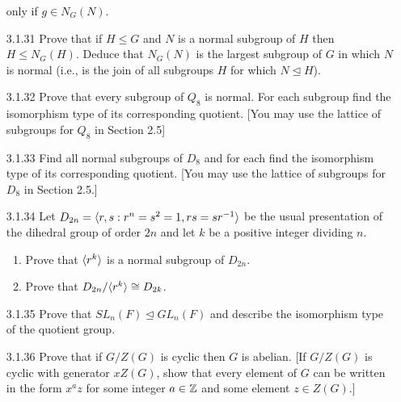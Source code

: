 \begin{enumerate}
                  only if $g \in N_G(N)$.
   \item[3.1.31]  Prove that if $H \le G$ and $N$ is a normal subgroup of $H$
                  then $H \le N_G(H)$. Deduce that $N_G(N)$ is the largest
                  subgroup of $G$ in which $N$ is normal (i.e., is the join of
                  all subgroups $H$ for which $N \trianglelefteq H$).
   \item[3.1.32]  Prove that every subgroup of $Q_8$ is normal. For each
                  subgroup find the isomorphism type of its corresponding
                  quotient. [You may use the lattice of subgroups for $Q_8$ in
                  Section 2.5]
   \item[3.1.33]  Find all normal subgroups of $D_8$ and for each find the
                  isomorphism type of its corresponding quotient. [You may use
                  the lattice of subgroups for $D_8$ in Section 2.5.]
   \item[3.1.34]  Let $D_{2n} = \langle r, s : r^n = s^2 = 1, rs = sr^{-1} \rangle$ be the
                  usual presentation of the dihedral group of order $2n$ and let
                  $k$ be a positive integer dividing $n$.
                  \begin{enumerate}
                     \item Prove that $\langle r^k \rangle$ is a normal subgroup of
                           $D_{2n}$.
                     \item Prove that $D_{2n}/\langle r^k \rangle \cong D_{2k}$.
                  \end{enumerate}
   \item[3.1.35]  Prove that $SL_n(F) \trianglelefteq GL_n(F)$ and describe the
                  isomorphism type of the quotient group.
   \item[3.1.36]  Prove that if $G/Z(G)$ is cyclic then $G$ is abelian. [If
                  $G/Z(G)$ is cyclic with generator $xZ(G)$, show that every
                  element of $G$ can be written in the form $x^az$ for some
                  integer $a \in \mathbb{Z}$ and some element $z \in Z(G)$.]

\end{enumerate}
